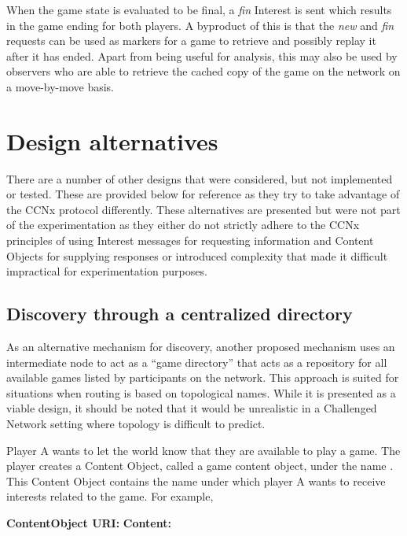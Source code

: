 \documentclass[a4paper,12pt]{report}      %
\begin{document}
When the game state is evaluated to be final, a \emph{fin} Interest is sent which results in the game ending for
both players. A byproduct of this is that the \emph{new} and \emph{fin} requests can be used as markers for a game to
retrieve and possibly replay it after it has ended. Apart from being useful for analysis, this may also be
used by observers who are able to retrieve the cached copy of the game on the network on a move-by-move basis.

\section{Design alternatives}

There are a number of other designs that were considered, but not implemented or tested. These are
provided below for reference as they try to take advantage of the CCNx protocol differently. These
alternatives are presented but were not part of the experimentation as they either do not strictly adhere
to the CCNx principles of using Interest messages for requesting information and Content Objects for
supplying responses or introduced complexity that made it difficult impractical for experimentation
purposes.

\subsection{Discovery through a centralized directory}

As an alternative mechanism for discovery, another proposed mechanism uses an intermediate node to
act as a “game directory” that acts as a repository for all available games listed by participants on the
network. This approach is suited for situations when routing is based on topological names. While it is
presented as a viable design, it should be noted that it would be unrealistic in a Challenged Network setting
where topology is difficult to predict. 

Player A wants to let the world know that they are available to play a game. The player creates a
Content Object, called a game content object, under the name \texttt{}. This Content Object contains the name under which player A wants to receive interests related to the game. For example,\newline

\noindent\textbf{ContentObject URI:} \texttt{}\newline
\textbf{Content:} \texttt{}\newline
\end{document}
